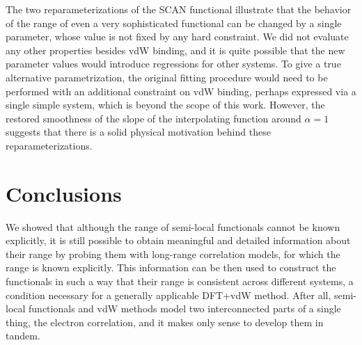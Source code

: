 The two reparameterizations of the SCAN functional illustrate that the behavior of the range of even a very sophisticated functional can be changed by a single parameter, whose value is not fixed by any hard constraint.
We did not evaluate any other properties besides vdW binding, and it is quite possible that the new parameter values would introduce regressions for other systems.
To give a true alternative parametrization, the original fitting procedure would need to be performed with an additional constraint on vdW binding, perhaps expressed via a single simple system, which is beyond the scope of this work.
However, the restored smoothness of the slope of the interpolating function around $\alpha=1$ suggests that there is a solid physical motivation behind these reparameterizations.

\section{Conclusions}

We showed that although the range of semi-local functionals cannot be known explicitly, it is still possible to obtain meaningful and detailed information about their range by probing them with long-range correlation models, for which the range is known explicitly.
This information can be then used to construct the functionals in such a way that their range is consistent across different systems, a condition necessary for a generally applicable DFT+vdW method.
After all, semi-local functionals and vdW methods model two interconnected parts of a single thing, the electron correlation, and it makes only sense to develop them in tandem.
